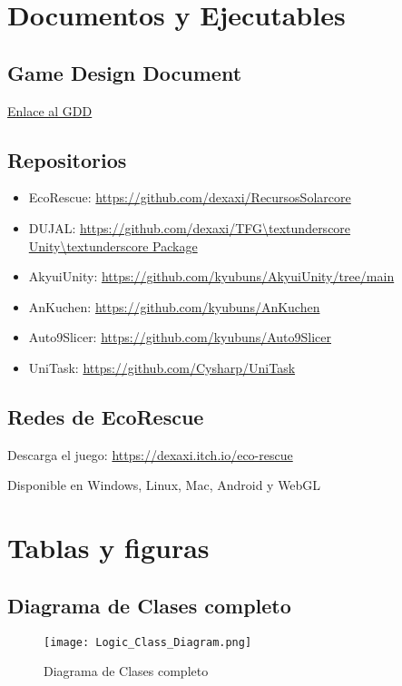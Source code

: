 \section{Documentos y Ejecutables}
\subsection{Game Design Document}

\href{https://github.com/dexaxi/RecursosSolarcore/blob/main/Assets/Documentation/Memoria%20-%20%C3%81ngel/tfg-template-master/EcoRescue.pdf}{Enlace al GDD}

\subsection{Repositorios}
\begin{itemize}
  \item EcoRescue: \url{https://github.com/dexaxi/RecursosSolarcore}
  \item DUJAL: \url{https://github.com/dexaxi/TFG\textunderscore Unity\textunderscore Package}
  \item AkyuiUnity: \url{https://github.com/kyubuns/AkyuiUnity/tree/main} 
  \item AnKuchen: \url{https://github.com/kyubuns/AnKuchen}
  \item Auto9Slicer: \url{https://github.com/kyubuns/Auto9Slicer}
  \item UniTask: \url{https://github.com/Cysharp/UniTask}
\end{itemize}

\subsection{Redes de EcoRescue}
Descarga el juego: \url{https://dexaxi.itch.io/eco-rescue}

Disponible en Windows, Linux, Mac, Android y WebGL

\section{Tablas y figuras}

\subsection{Diagrama de Clases completo}

\begin{figure}[H]
  \centering
  \texttt{[image: Logic\_Class\_Diagram.png]}
  \caption{Diagrama de Clases completo}
  \label{fig:logicUML}
\end{figure}
\raggedbottom


